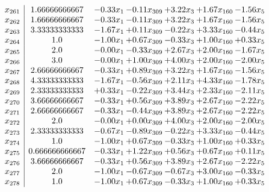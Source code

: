 \documentclass[8pt]{article}
\begin{document}
\[\begin{array}{c| c c@{\hskip 2pt} c@{\hskip 2pt} c@{\hskip 2pt} c@{\hskip 2pt} c@{\hskip 2pt} }
 x_{261}   &  1.66666666667 & -0.33 x_{1} & -0.11 x_{309} & +  3.22 x_{3} & +  1.67 x_{160} & -1.56 x_{5}\\
 x_{262}   &  1.66666666667 & -0.33 x_{1} & -0.11 x_{309} & +  3.22 x_{3} & +  1.67 x_{160} & -1.56 x_{5}\\
 x_{263}   &  3.33333333333 & -1.67 x_{1} & +  0.11 x_{309} & -0.22 x_{3} & +  3.33 x_{160} & -0.44 x_{5}\\
 x_{264}   &  1.0 & -1.00 x_{1} & +  0.67 x_{309} & -0.33 x_{3} & +  1.00 x_{160} & +  0.33 x_{5}\\
 x_{265}   &  2.0 & -0.00 x_{1} & -0.33 x_{309} & +  2.67 x_{3} & +  2.00 x_{160} & -1.67 x_{5}\\
 x_{266}   &  3.0 & -0.00 x_{1} & +  1.00 x_{309} & +  4.00 x_{3} & +  2.00 x_{160} & -2.00 x_{5}\\
 x_{267}   &  2.66666666667 & -0.33 x_{1} & +  0.89 x_{309} & +  3.22 x_{3} & +  1.67 x_{160} & -1.56 x_{5}\\
 x_{268}   &  4.33333333333 & -1.67 x_{1} & -0.56 x_{309} & +  2.11 x_{3} & +  4.33 x_{160} & -1.78 x_{5}\\
 x_{269}   &  2.33333333333 & +  0.33 x_{1} & -0.22 x_{309} & +  3.44 x_{3} & +  2.33 x_{160} & -2.11 x_{5}\\
 x_{270}   &  3.66666666667 & -0.33 x_{1} & +  0.56 x_{309} & +  3.89 x_{3} & +  2.67 x_{160} & -2.22 x_{5}\\
 x_{271}   &  2.66666666667 & -0.33 x_{1} & -0.44 x_{309} & +  3.89 x_{3} & +  2.67 x_{160} & -2.22 x_{5}\\
 x_{272}   &  2.0 & -0.00 x_{1} & +  0.00 x_{309} & +  4.00 x_{3} & +  2.00 x_{160} & -2.00 x_{5}\\
 x_{273}   &  2.33333333333 & -0.67 x_{1} & -0.89 x_{309} & -0.22 x_{3} & +  3.33 x_{160} & -0.44 x_{5}\\
 x_{274}   &  1.0 & -1.00 x_{1} & +  0.67 x_{309} & -0.33 x_{3} & +  1.00 x_{160} & +  0.33 x_{5}\\
 x_{275}   &  0.666666666667 & -0.33 x_{1} & +  1.22 x_{309} & +  0.56 x_{3} & +  0.67 x_{160} & +  0.11 x_{5}\\
 x_{276}   &  3.66666666667 & -0.33 x_{1} & +  0.56 x_{309} & +  3.89 x_{3} & +  2.67 x_{160} & -2.22 x_{5}\\
 x_{277}   &  2.0 & -1.00 x_{1} & -0.67 x_{309} & -0.67 x_{3} & +  3.00 x_{160} & -0.33 x_{5}\\
 x_{278}   &  1.0 & -1.00 x_{1} & +  0.67 x_{309} & -0.33 x_{3} & +  1.00 x_{160} & +  0.33 x_{5}\\

\end{array}\]
\end{document}
